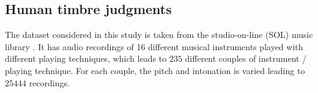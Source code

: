 \documentclass{bmcart}
\newcommand{\nmu}{}
\newcommand{\ml}[1]{\textcolor{blue}{ML: #1}\xspace}
\newcommand{\vl}[1]{\textcolor{red}{VL: #1}\xspace}
\begin{document}
\begin{backmatter}
%
%
%
%
%
%

\section*{\nmu Human timbre judgments}
\label{sec:subjective}

The dataset considered in this study is taken
from the studio-on-line (SOL) music library  \cite{peeters2000instrument}.
It has audio recordings of 16 different musical instruments played
with different playing techniques,
which leads to $235$ different couples of instrument / playing technique.
For each couple, the pitch and intonation is varied leading to $25444$ recordings.


\end{backmatter}
\end{document}
